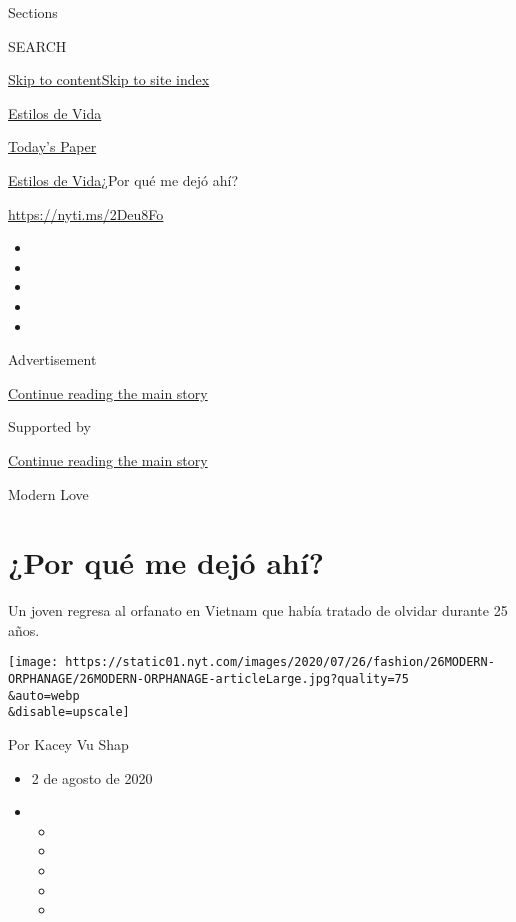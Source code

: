 Sections

SEARCH

\protect\hyperlink{site-content}{Skip to
content}\protect\hyperlink{site-index}{Skip to site index}

\href{https://www.nytimes.com/es/section/estilos-de-vida}{Estilos de
Vida}

\href{https://myaccount.nytimes.com/auth/login?response_type=cookie\&client_id=vi}{}

\href{https://www.nytimes.com/section/todayspaper}{Today's Paper}

\href{/es/section/estilos-de-vida}{Estilos de Vida}\textbar{}¿Por qué me
dejó ahí?

\url{https://nyti.ms/2Deu8Fo}

\begin{itemize}
\item
\item
\item
\item
\item
\end{itemize}

Advertisement

\protect\hyperlink{after-top}{Continue reading the main story}

Supported by

\protect\hyperlink{after-sponsor}{Continue reading the main story}

Modern Love

\hypertarget{por-quuxe9-me-dejuxf3-ahuxed}{%
\section{¿Por qué me dejó ahí?}\label{por-quuxe9-me-dejuxf3-ahuxed}}

Un joven regresa al orfanato en Vietnam que había tratado de olvidar
durante 25 años.

\texttt{[image: https://static01.nyt.com/images/2020/07/26/fashion/26MODERN-ORPHANAGE/26MODERN-ORPHANAGE-articleLarge.jpg?quality=75\\\&auto=webp\\\&disable=upscale]}

Por Kacey Vu Shap

\begin{itemize}
\item
  2 de agosto de 2020
\item
  \begin{itemize}
  \item
  \item
  \item
  \item
  \item
  \end{itemize}
\end{itemize}

